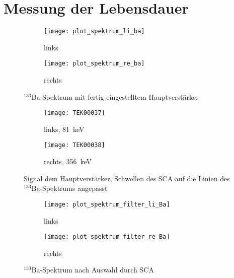 \documentclass[11pt, ngerman, fleqn, DIV=15, headinclude, BCOR=2cm]{scrreprt}
\begin{document}
\fehlt%

\clearpage

\section{Messung der Lebensdauer}

\begin{figure}
	\centering
	\begin{subfigure}{0.49 \textwidth}
		\texttt{[image: plot\_spektrum\_li\_ba]}
		\caption{%
			links
		}
		\label{fig:ba_slow_hv_eingestellt-li_plot}
	\end{subfigure}
	\begin{subfigure}{0.49 \textwidth}
		\texttt{[image: plot\_spektrum\_re\_ba]}
		\caption{%
			rechts
		}
		\label{fig:ba_slow_hv_eingestellt-re_plot}
	\end{subfigure}
	\caption{%
		$^{133}\text{Ba}$-Spektrum mit fertig eingestelltem
		Hauptverstärker
	}
	\label{fig:ba_slow_signal_hv_eingestellt_plot}
\end{figure}

\begin{figure}
	\centering
	\begin{subfigure}{0.49 \textwidth}
		\texttt{[image: TEK00037]}
		\caption{%
			links, \SI{81}{\kilo\electronvolt}
		}
		\label{fig:ba_slow_signal_sca_eingestellt-li}
	\end{subfigure}
	\begin{subfigure}{0.49 \textwidth}
		\texttt{[image: TEK00038]}
		\caption{%
			rechts, \SI{356}{\kilo\electronvolt}
		}
		\label{fig:ba_slow_signal_sca_eingestellt-re}
	\end{subfigure}
	\caption{%
		Signal dem Hauptverstärker, Schwellen des SCA auf die Linien
		des $^{133}\text{Ba}$-Spektrums angepasst
	}
	\label{fig:ba_slow_signal_sca_eingestellt}
\end{figure}

\begin{figure}
	\centering
	\begin{subfigure}{0.49 \textwidth}
		\texttt{[image: plot\_spektrum\_filter\_li\_Ba]}
		\caption{%
			links
		}
		\label{fig:ba_slow_sca_eingestellt-li_plot}
	\end{subfigure}
	\begin{subfigure}{0.49 \textwidth}
		\texttt{[image: plot\_spektrum\_filter\_re\_Ba]}
		\caption{%
			rechts
		}
		\label{fig:ba_slow_sca_eingestellt-re_plot}
	\end{subfigure}
	\caption{%
		$^{133}\text{Ba}$-Spektrum nach Auswahl durch SCA
	}
	\label{fig:ba_slow_signal_sca_eingestellt_plot}
\end{figure}
\end{document}
